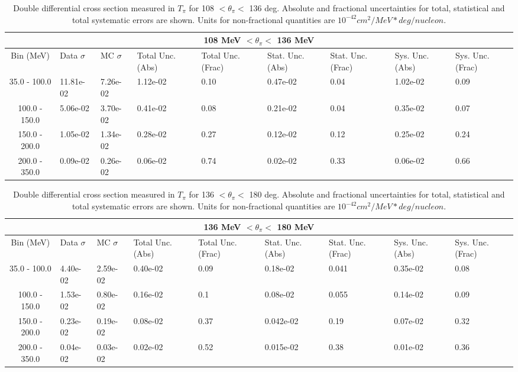 \begin{table}[!htb]
    \centering
    \tiny
    \begin{tabular}{|c|p{0.5in}|p{0.5in}|p{0.5in}|p{0.5in}|p{0.5in}|p{0.5in}|p{0.5in}|p{0.5in}|}

        \hline
        \multicolumn{9}{c}{108 MeV $ < \theta_\pi < $ 136 MeV}\\
        \hline
        Bin (MeV)& Data $\sigma$ & MC $\sigma$ & Total Unc. (Abs) & Total Unc. (Frac)  & Stat. Unc. (Abs) & Stat. Unc. (Frac) & Sys. Unc. (Abs) & Sys. Unc. (Frac)\\ \hline
35.0 - 100.0 & 11.81e-02 & 7.26e-02 & 1.12e-02 & 0.10 & 0.47e-02 & 0.04 & 1.02e-02 & 0.09\\ \hline
100.0 - 150.0 & 5.06e-02 & 3.70e-02 & 0.41e-02 & 0.08 & 0.21e-02 & 0.04 & 0.35e-02 & 0.07\\ \hline
150.0 - 200.0 & 1.05e-02 & 1.34e-02 & 0.28e-02 & 0.27 & 0.12e-02 & 0.12 & 0.25e-02 & 0.24\\ \hline
200.0 - 350.0 & 0.09e-02 & 0.26e-02 & 0.06e-02 & 0.74 & 0.02e-02 & 0.33 & 0.06e-02 & 0.66\\ \hline

    \end{tabular}
    \caption{Double differential cross section measured in $T_\pi$ for 108 $ < \theta_\pi < $ 136 deg. Absolute and fractional uncertainties for total, statistical and total systematic errors are shown. Units for non-fractional quantities are $10^{-42}cm^2/MeV*deg/nucleon$.}
    \label{tab:ApdxA:XSecTable2Dtpithetapi7}
\end{table}
\begin{table}[!htb]
    \centering
    \tiny
    \begin{tabular}{|c|p{0.5in}|p{0.5in}|p{0.5in}|p{0.5in}|p{0.5in}|p{0.5in}|p{0.5in}|p{0.5in}|}

        \hline
        \multicolumn{9}{c}{136 MeV $ < \theta_\pi < $ 180 MeV}\\
        \hline
        Bin (MeV)& Data $\sigma$ & MC $\sigma$ & Total Unc. (Abs) & Total Unc. (Frac)  & Stat. Unc. (Abs) & Stat. Unc. (Frac) & Sys. Unc. (Abs) & Sys. Unc. (Frac)\\ \hline
35.0 - 100.0 & 4.40e-02 & 2.59e-02 & 0.40e-02 & 0.09 & 0.18e-02 & 0.041 & 0.35e-02 & 0.08\\ \hline
100.0 - 150.0 & 1.53e-02 & 0.80e-02 & 0.16e-02 & 0.1 & 0.08e-02 & 0.055 & 0.14e-02 & 0.09\\ \hline
150.0 - 200.0 & 0.23e-02 & 0.19e-02 & 0.08e-02 & 0.37 & 0.042e-02 & 0.19 & 0.07e-02 & 0.32\\ \hline
200.0 - 350.0 & 0.04e-02 & 0.03e-02 & 0.02e-02 & 0.52 & 0.015e-02 & 0.38 & 0.01e-02 & 0.36\\ \hline

    \end{tabular}
    \caption{Double differential cross section measured in $T_\pi$ for 136 $ < \theta_\pi < $ 180 deg. Absolute and fractional uncertainties for total, statistical and total systematic errors are shown. Units for non-fractional quantities are $10^{-42}cm^2/MeV*deg/nucleon$.}
    \label{tab:ApdxA:XSecTable2Dtpithetapi8}
\end{table}

